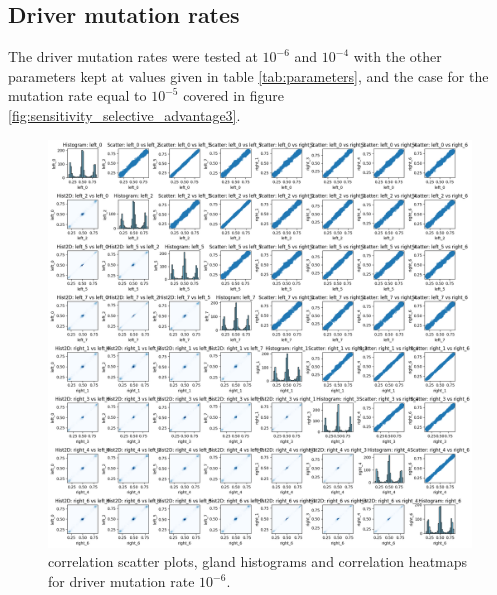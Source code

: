 \subsection{Driver mutation rates}
The driver mutation rates were tested at $10^{-6}$ and $10^{-4}$ with the other parameters kept at values given in table \ref{tab:parameters}, and the case for the mutation rate equal to $10^{-5}$ covered in figure \ref{fig:sensitivity_selective_advantage3}.
\begin{figure}[h]
    \centering
    \includegraphics[width=\textwidth]{Chapter_methylation/figures/sensitivity_driver1.png}
    \caption{correlation scatter plots, gland histograms and correlation heatmaps for driver mutation rate $10^{-6}$.}
    \label{fig:sensitivity_driver1}
\end{figure}
